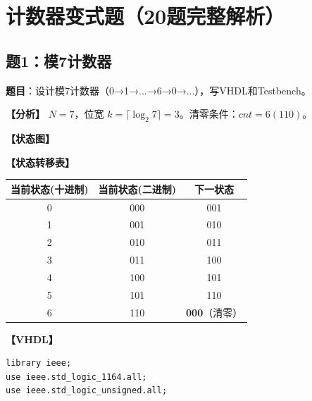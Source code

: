 \chapter{计数器变式题（20题完整解析）}

\section{题1：模7计数器}

\textbf{题目}：设计模7计数器（0→1→...→6→0→...），写VHDL和Testbench。

\begin{solution}[完整解答]

\textbf{【分析】}
$N=7$，位宽 $k=\lceil\log_2 7\rceil=3$。清零条件：$cnt = 6(110)$。

\textbf{【状态图】}
\begin{center}
\end{center}

\textbf{【状态转移表】}
\begin{center}
\begin{tabular}{|c|c|c|}
\hline 当前状态(十进制) & 当前状态(二进制) & 下一状态 \\
\hline 0 & 000 & 001 \\ \hline 1 & 001 & 010 \\
\hline 2 & 010 & 011 \\ \hline 3 & 011 & 100 \\
\hline 4 & 100 & 101 \\ \hline 5 & 101 & 110 \\
\hline 6 & 110 & \textbf{000}（清零）\\
\hline
\end{tabular}
\end{center}

\textbf{【VHDL】}
\begin{lstlisting}
library ieee;
use ieee.std_logic_1164.all;
use ieee.std_logic_unsigned.all;


\end{lstlisting}
\end{solution}
